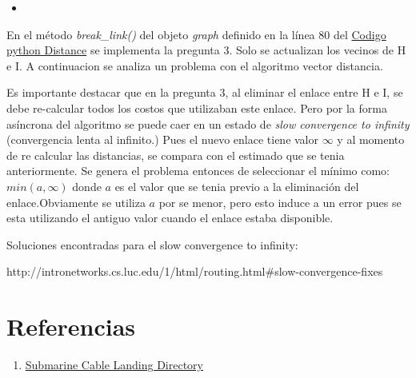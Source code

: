 \documentclass{article}
\newcommand{\python}[2]{
\begin{itemize}
\item[]
\end{itemize}
}
\begin{document}
        \python{distance}{Distance}    

        En el método \textit{break\_link()} del objeto \textit{graph} definido en la línea 80 del \hyperref[distance]{Codigo python Distance} se implementa la pregunta 3. Solo se actualizan los vecinos de H e I. A continuacion se analiza un problema con el algoritmo vector distancia.

        Es importante destacar que en la pregunta 3, al eliminar el enlace entre H e I, se debe re-calcular todos los costos que utilizaban este enlace. Pero por la forma asíncrona del algoritmo se puede caer en un estado de \textit{slow convergence to infinity} (convergencia lenta al infinito.) Pues el nuevo enlace tiene valor $\infty$ y al momento de re calcular las distancias, se compara con el estimado que se tenia anteriormente. Se genera el problema entonces de seleccionar el mínimo como: $min(a, \infty)$ donde $a$ es el valor que se tenia previo a la eliminación del enlace.Obviamente se utiliza $a$ por se menor, pero esto induce a un error pues se esta utilizando el antiguo valor cuando el enlace estaba disponible.

        Soluciones encontradas para el slow convergence to infinity:

        http://intronetworks.cs.luc.edu/1/html/routing.html\#slow-convergence-fixes

        

    \section*{Referencias}

        \begin{enumerate}
            \item \href{http://goo.gl/QFhvU8}{Submarine Cable Landing Directory}
        \end{enumerate}
\end{document}

